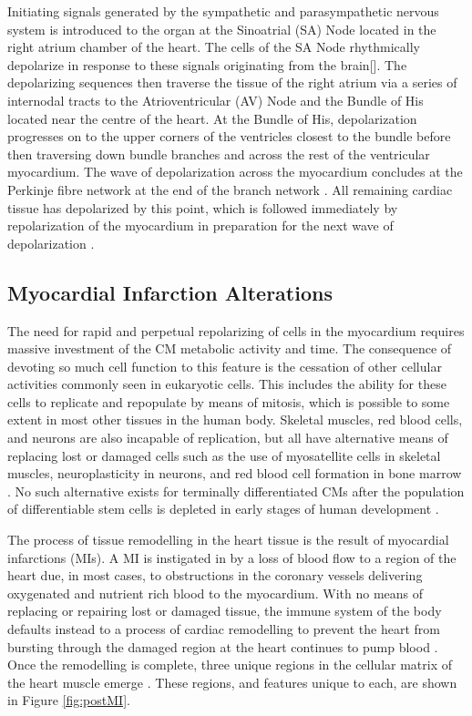 Initiating signals generated by the sympathetic and parasympathetic nervous system is introduced to the organ at the Sinoatrial (SA) Node located in the right atrium chamber of the heart. The cells of the SA Node rhythmically depolarize in response to these signals originating from the brain[]. The depolarizing sequences then traverse the tissue of the right atrium via a series of internodal tracts to the Atrioventricular (AV) Node and the Bundle of His located near the centre of the heart. At the Bundle of His, depolarization progresses on to the upper corners of the ventricles closest to the bundle before then traversing down bundle branches and across the rest of the ventricular myocardium. The wave of depolarization across the myocardium concludes at the Perkinje fibre network at the end of the branch network \cite{saltzman_biomedical_2015}. All remaining cardiac tissue has depolarized by this point, which is followed immediately by repolarization of the myocardium in preparation for the next wave of depolarization \cite{saltzman_biomedical_2015}.

\subsection{Myocardial Infarction Alterations}

The need for rapid and perpetual repolarizing of cells in the myocardium requires massive investment of the CM metabolic activity and time. The consequence of devoting so much cell function to this feature is the cessation of other cellular activities commonly seen in eukaryotic cells. This includes the ability for these cells to replicate and repopulate by means of mitosis, which is possible to some extent in most other tissues in the human body. Skeletal muscles, red blood cells, and neurons are also incapable of replication, but all have alternative means of replacing lost or damaged cells such as the use of myosatellite cells in skeletal muscles, neuroplasticity in neurons, and red blood cell formation in bone marrow \cite{paxton_leeds_2003}. No such alternative exists for terminally differentiated CMs after the population of differentiable stem cells is depleted in early stages of human development \cite{uygur_mechanisms_2016}. 

 The process of tissue remodelling in the heart tissue is the result of myocardial infarctions (MIs). A MI is instigated in by a loss of blood flow to a region of the heart due, in most cases, to obstructions in the coronary vessels delivering oxygenated and nutrient rich blood to the myocardium. With no means of replacing or repairing lost or damaged tissue, the immune system of the body defaults instead to a process of cardiac remodelling to prevent the heart from bursting through the damaged region at the heart continues to pump blood \cite{huethorst_development_2022}.  Once the remodelling is complete, three unique regions in the cellular matrix of the heart muscle emerge \cite{huethorst_development_2022}. These regions, and features unique to each, are shown in Figure \ref{fig:postMI}. 

